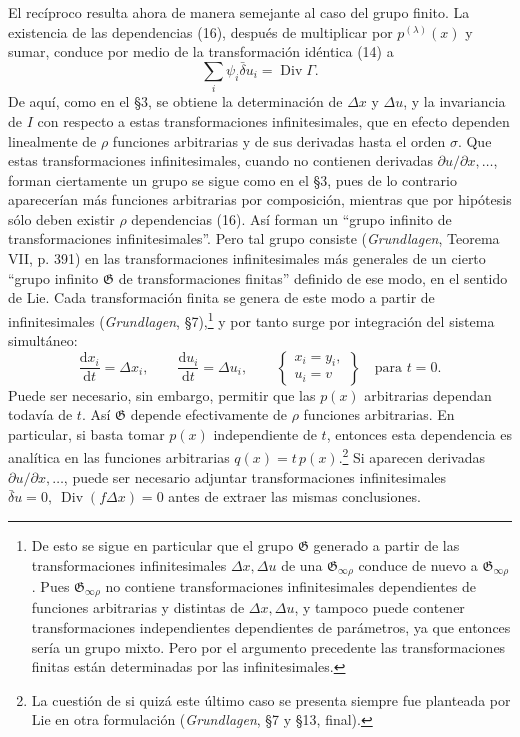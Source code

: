 \documentclass[11pt]{article}
\newcommand{\D}{\Delta}
\providecommand{\dd}{\mathrm d}
\providecommand{\Div}{\operatorname{Div}}
\providecommand{\G}{\mathfrak G}
\providecommand{\bd}{\bar{\delta}}
\providecommand{\p}{\partial}
\begin{document}
El recíproco resulta ahora de manera semejante al caso del grupo finito. La existencia de las dependencias (16), después de multiplicar por \(p^{(\lambda)}(x)\) y sumar, conduce por medio de la transformación idéntica (14) a
\[
\sum_i\psi_i\bd u_i=\Div\Gamma.
\]
De aquí, como en el \S{}3, se obtiene la determinación de \(\D x\) y \(\D u\), y la invariancia de \(I\) con respecto a estas transformaciones infinitesimales, que en efecto dependen linealmente de \(\rho\) funciones arbitrarias y de sus derivadas hasta el orden \(\sigma\). Que estas transformaciones infinitesimales, cuando no contienen derivadas \(\p u/\p x,\ldots\), forman ciertamente un grupo se sigue como en el \S{}3, pues de lo contrario aparecerían más funciones arbitrarias por composición, mientras que por hipótesis sólo deben existir \(\rho\) dependencias (16). Así forman un ``grupo infinito de transformaciones infinitesimales''. Pero tal grupo consiste (\emph{Grundlagen}, Teorema VII, p. 391) en las transformaciones infinitesimales más generales de un cierto ``grupo infinito \(\G\) de transformaciones finitas'' definido de ese modo, en el sentido de Lie. Cada transformación finita se genera de este modo a partir de infinitesimales (\emph{Grundlagen}, \S{}7),\footnote{De esto se sigue en particular que el grupo \(\G\) generado a partir de las transformaciones infinitesimales \(\D x,\D u\) de una \(\G_{\infty\rho}\) conduce de nuevo a \(\G_{\infty\rho}\). Pues \(\G_{\infty\rho}\) no contiene transformaciones infinitesimales dependientes de funciones arbitrarias y distintas de \(\D x,\D u\), y tampoco puede contener transformaciones independientes dependientes de parámetros, ya que entonces sería un grupo mixto. Pero por el argumento precedente las transformaciones finitas están determinadas por las infinitesimales.} y por tanto surge por integración del sistema simultáneo:
\[
\frac{\dd x_i}{\dd t}=\D x_i,\qquad
\frac{\dd u_i}{\dd t}=\D u_i,\qquad
\left\{\begin{array}{l}
x_i=y_i,\\
u_i=v
\end{array}\right\}
\quad\text{para }t=0.
\]
Puede ser necesario, sin embargo, permitir que las \(p(x)\) arbitrarias dependan todavía de \(t\). Así \(\G\) depende efectivamente de \(\rho\) funciones arbitrarias. En particular, si basta tomar \(p(x)\) independiente de \(t\), entonces esta dependencia es analítica en las funciones arbitrarias \(q(x)=t\,p(x)\).\footnote{La cuestión de si quizá este último caso se presenta siempre fue planteada por Lie en otra formulación (\emph{Grundlagen}, \S{}7 y \S{}13, final).} Si aparecen derivadas \(\p u/\p x,\ldots\), puede ser necesario adjuntar transformaciones infinitesimales \(\bd u=0,\ \Div(f\D x)=0\) antes de extraer las mismas conclusiones.
\end{document}
